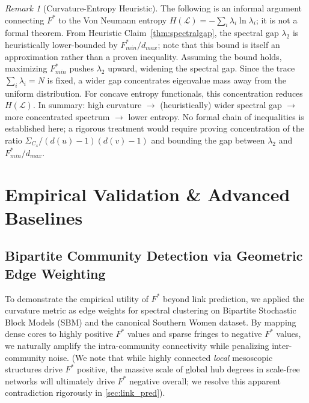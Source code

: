 \documentclass{siuro250211}
\theoremstyle{remark}
\newtheorem{remark}{Remark}
\theoremstyle{plain}
\begin{document}
\begin{remark}[Curvature-Entropy Heuristic]
The following is an informal argument connecting $F^*$ to the Von Neumann entropy $H(\mathcal{L}) = -\sum_i \lambda_i \ln \lambda_i$; it is not a formal theorem. From Heuristic Claim~\ref{thm:spectralgap}, the spectral gap $\lambda_2$ is heuristically lower-bounded by $F_{min}^*/d_{max}$; note that this bound is itself an approximation rather than a proven inequality. Assuming the bound holds, maximizing $F_{min}^*$ pushes $\lambda_2$ upward, widening the spectral gap. Since the trace $\sum_i \lambda_i = N$ is fixed, a wider gap concentrates eigenvalue mass away from the uniform distribution. For concave entropy functionals, this concentration reduces $H(\mathcal{L})$. In summary: high curvature $\to$ (heuristically) wider spectral gap $\to$ more concentrated spectrum $\to$ lower entropy. No formal chain of inequalities is established here; a rigorous treatment would require proving concentration of the ratio $\Sigma_{C_4}/(d(u)-1)(d(v)-1)$ and bounding the gap between $\lambda_2$ and $F_{min}^*/d_{max}$.
\end{remark}

\section{Empirical Validation \& Advanced Baselines}

\subsection{Bipartite Community Detection via Geometric Edge Weighting}
To demonstrate the empirical utility of $F^*$ beyond link prediction, we applied the curvature metric as edge weights for spectral clustering on Bipartite Stochastic Block Models (SBM) and the canonical Southern Women dataset. By mapping dense cores to highly positive $F^*$ values and sparse fringes to negative $F^*$ values, we naturally amplify the intra-community connectivity while penalizing inter-community noise. (We note that while highly connected \emph{local} mesoscopic structures drive $F^*$ positive, the massive scale of global hub degrees in scale-free networks will ultimately drive $F^*$ negative overall; we resolve this apparent contradiction rigorously in \cref{sec:link_pred}).
\end{document}

